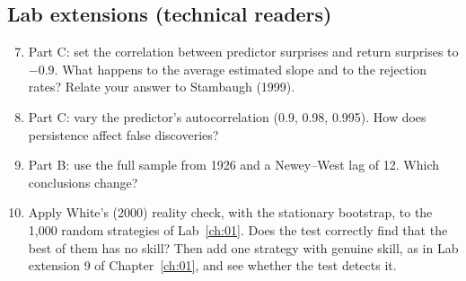 \subsection*{Lab extensions (technical readers)}

\begin{enumerate}
  \setcounter{enumi}{6}
  \item Part C: set the correlation between predictor surprises and return surprises to $-0.9$. What happens to the average estimated slope and to the rejection rates? Relate your answer to Stambaugh (1999).
  \item Part C: vary the predictor's autocorrelation (0.9, 0.98, 0.995). How does persistence affect false discoveries?
  \item Part B: use the full sample from 1926 and a Newey--West lag of 12. Which conclusions change?
  \item Apply White's (2000) reality check, with the stationary bootstrap, to the 1,000 random strategies of Lab~\ref{ch:01}. Does the test correctly find that the best of them has no skill? Then add one strategy with genuine skill, as in Lab extension 9 of Chapter~\ref{ch:01}, and see whether the test detects it.
\end{enumerate}
